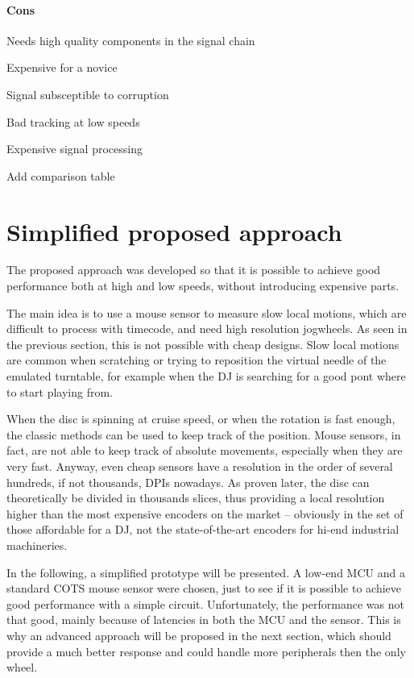 \documentclass[a4paper,10pt]{article}
\begin{document}
\begin{multicols}{2}
\paragraph{Cons}
\begin{itemize*}
	\item Needs high quality components in the signal chain
	\item Expensive for a novice
	\item Signal subsceptible to corruption
	\item Bad tracking at low speeds
	\item Expensive signal processing
\end{itemize*}



\TODO Add comparison table


\section{Simplified proposed approach}

The proposed approach was developed so that it is possible to achieve good
performance both at high and low speeds, without introducing expensive parts.

The main idea is to use a mouse sensor to measure slow local motions, which
are difficult to process with timecode, and need high resolution jogwheels.
As seen in the previous section, this is not possible with cheap designs.
Slow local motions are common when scratching or trying to reposition the
virtual needle of the emulated turntable, for example when the DJ is searching
for a good pont where to start playing from.

When the disc is spinning at cruise speed, or when the rotation is fast
enough, the classic methods can be used to keep track of the position.
Mouse sensors, in fact, are not able to keep track of absolute movements,
especially when they are very fast. Anyway, even cheap sensors have a
resolution in the order of several hundreds, if not thousands, DPIs nowadays.
As proven later, the disc can theoretically be divided in thousands slices,
thus providing a local resolution higher than the most expensive encoders on
the market -- obviously in the set of those affordable for a DJ, not the
state-of-the-art encoders for hi-end industrial machineries.

In the following, a simplified prototype will be presented. A low-end MCU and
a standard COTS mouse sensor were chosen, just to see if it is possible to
achieve good performance with a simple circuit. Unfortunately, the performance
was not that good, mainly because of latencies in both the MCU and the sensor.
This is why an advanced approach will be proposed in the next section, which
should provide a much better response and could handle more peripherals then
the only wheel.



\end{multicols}
\end{document}
